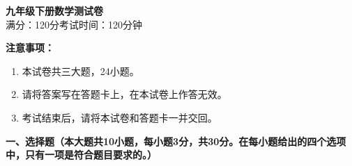 \documentclass[12pt, a4paper]{ctexart}
\begin{document}
\begin{center}
{\LARGE\bfseries 九年级下册数学测试卷}\\[0.5em]
{\large 满分：120分\quad 考试时间：120分钟}
\end{center}

\vspace{0.5em}
\noindent\textbf{注意事项：}
\begin{enumerate}[label=\arabic*., leftmargin=2em]
\item 本试卷共三大题，24小题。
\item 请将答案写在答题卡上，在本试卷上作答无效。
\item 考试结束后，请将本试卷和答题卡一并交回。
\end{enumerate}

\vspace{0.5em}

\noindent\textbf{一、选择题（本大题共10小题，每小题3分，共30分。在每小题给出的四个选项中，只有一项是符合题目要求的。）}
\end{document}
